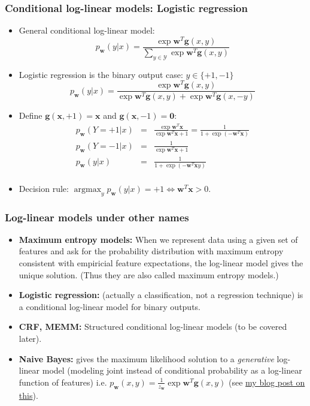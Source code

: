 \documentclass[ignorenonframetext,plain]{beamer}
\DeclareMathOperator*{\argmax}{argmax}
\renewcommand{\vec}{\mathbf}
\begin{document}
\begin{frame}\frametitle{Conditional log-linear models: Logistic regression}
\begin{itemize}
\item General conditional log-linear model:\[
  p_\vec{w}(y|x) = \frac{\exp \vec{w}^T \vec{g}(x, y)}
  {\sum_{y\in\mathcal{Y}} \exp \vec{w}^T \vec{g}(x, y)}
\]
\item Logistic regression is the binary output case: $y\in\{+1,-1\}$ \[
  p_\vec{w}(y|x) = \frac{\exp \vec{w}^T \vec{g}(x, y)}
  {\exp \vec{w}^T \vec{g}(x, y)+\exp \vec{w}^T \vec{g}(x, -y)}
\]
\item Define $\vec{g}(\vec{x}, +1) = \vec{x}$ and $\vec{g}(\vec{x},
  -1) = \vec{0}$:
\begin{eqnarray*}
  p_\vec{w}(Y=+1|x) &=&
  \frac{\exp \vec{w}^T \vec{x}}
       {\exp \vec{w}^T \vec{x}+1} =
  \frac{1}{1+\exp(-\vec{w}^T \vec{x})} \\
  p_\vec{w}(Y=-1|x) &=&
  \frac{1}{\exp \vec{w}^T \vec{x}+1} \\
  p_\vec{w}(y|x) &=& 
  \frac{1}{1+\exp(-\vec{w}^T \vec{x} y)} \\
\end{eqnarray*}
\item Decision rule: $\argmax_y p_\vec{w}(y|x)=+1\Leftrightarrow\vec{w}^T\vec{x} > 0$.
\end{itemize}  
\end{frame}

\begin{frame}\frametitle{Log-linear models under other names}
\begin{itemize}
\item \textbf{Maximum entropy models:} When we represent data using a
  given set of features and ask for the probability distribution with
  maximum entropy consistent with empiricial feature expectations, the
  log-linear model gives the unique solution.  (Thus they are also
  called maximum entropy models.)
\item \textbf{Logistic regression:} (actually a classification, not a
  regression technique) is a conditional log-linear model for binary
  outputs.
\item \textbf{CRF, MEMM:} Structured conditional log-linear models (to
  be covered later).
\item \textbf{Naive Bayes:} gives the maximum likelihood solution to a
  {\em generative} log-linear model (modeling joint instead of
  conditional probability as a log-linear function of features)
  i.e. $p_\vec{w}(x,y) = \frac{1}{z_\vec{w}}\exp \vec{w}^T \vec{g}(x, y)$
  (see
  \href{http://www.denizyuret.com/2010/11/naive-bayes-is-joint-maximum-entropy.html}{my
    blog post on this}).
\end{itemize}
\end{frame}
\end{document}
